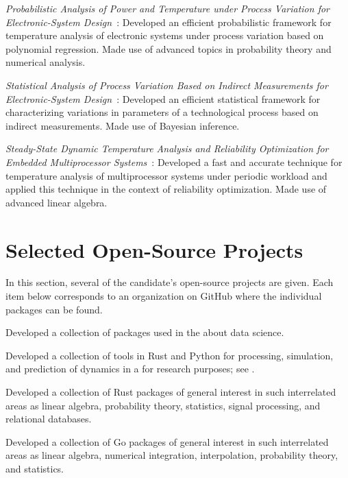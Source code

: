 \documentclass[journal]{IEEEtran}
\begin{document}
\date{2014} \emph{Probabilistic Analysis of Power and Temperature under Process
Variation for Electronic-System Design}~\cite{ukhov2014b}: Developed an
efficient probabilistic framework for temperature analysis of electronic systems
under process variation based on polynomial regression. Made use of advanced
topics in probability theory and numerical analysis.

\date{2014} \emph{Statistical Analysis of Process Variation Based on Indirect
Measurements for Electronic-System Design}~\cite{ukhov2014a}: Developed an
efficient statistical framework for characterizing variations in parameters of a
technological process based on indirect measurements. Made use of Bayesian
inference.

\date{2012} \emph{Steady-State Dynamic Temperature Analysis and Reliability
Optimization for Embedded Multiprocessor Systems}~\cite{ukhov2012}: Developed a
fast and accurate technique for temperature analysis of multiprocessor systems
under periodic workload and applied this technique in the context of reliability
optimization. Made use of advanced linear algebra.

\section{Selected Open-Source Projects} 

In this section, several of the candidate's open-source projects are given. Each
item below corresponds to an organization on GitHub where the individual
packages can be found.

\emph{} Developed a collection of packages used in the
 about data science.

\emph{} Developed a collection of tools in Rust and
Python for processing, simulation, and prediction of dynamics in a
 for research
purposes; see .

\emph{} Developed a collection of Rust packages of general
interest in such interrelated areas as linear algebra, probability theory,
statistics, signal processing, and relational databases.

\emph{} Developed a collection of Go packages of general interest in such
interrelated areas as linear algebra, numerical integration, interpolation,
probability theory, and statistics.
\end{document}
